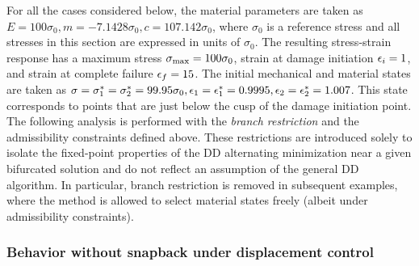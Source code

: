 \documentclass[10pt]{cas-sc}
\newenvironment{addedblock}
{\begingroup\color{blue!80}}
{\endgroup}
\begin{document}
\begin{addedblock}
For all the cases considered below, the material parameters are taken as $ E=100 \sigma_0, m=-7.1428 \sigma_0, c=107.142 \sigma_0$, where $\sigma_0$ is a reference stress and all stresses in this section are expressed in units of $\sigma_0$. The resulting stress-strain response has a maximum stress ${\sigma}_{\rm max} = 100 \sigma_0$, strain at damage initiation ${\epsilon}_i=1$, and strain at complete failure ${\epsilon}_f=15$. The initial mechanical and material states are taken as ${\sigma}={\sigma}_1^*={\sigma}_2^*=99.95\sigma_0,{\epsilon}_1={\epsilon}_1^* =0.9995,{\epsilon}_2={\epsilon}_2^* =1.007$. This state corresponds to points that are just below the cusp of the damage initiation point. The following analysis is performed with the \textit{branch restriction} and the admissibility constraints defined above. These restrictions are introduced solely to isolate the fixed-point properties of the DD alternating minimization near a given bifurcated solution and do not reflect an assumption of the general DD algorithm. In particular, branch restriction is removed in subsequent examples, where the method is allowed to select material states freely (albeit under admissibility constraints).
\end{addedblock}


\subsubsection*{Behavior without snapback under displacement control}
\end{document}
